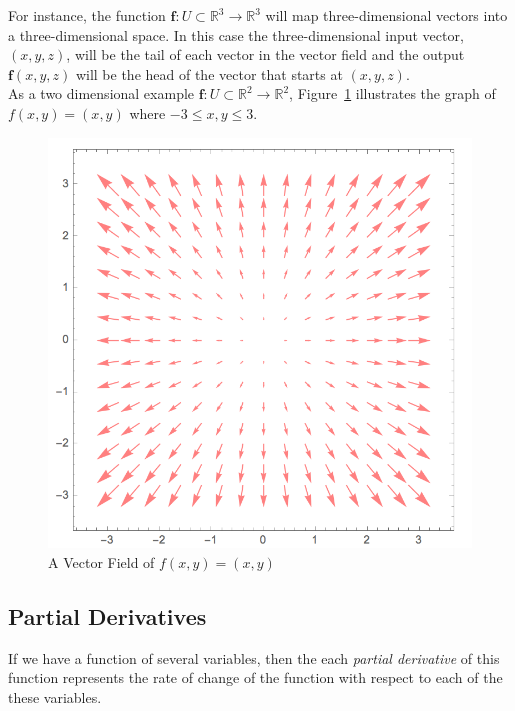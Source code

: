 \documentclass[12pt]{article}
\begin{document}
For instance, the function $\mathbf{f}:U\subset\mathbb{R}^3\rightarrow\mathbb{R}^3$ will map three-dimensional vectors into a three-dimensional space. In this case the three-dimensional input vector, $(x,y,z)$, will be the tail of each vector in the vector field and the output $\mathbf{f}(x,y,z)$ will be the head of the vector that starts at $(x,y,z)$. \\

As a two dimensional example $\mathbf{f}:U\subset\mathbb{R}^2\rightarrow\mathbb{R}^2$, Figure~\ref{fig:vectorfield} illustrates the graph of $f(x,y) = (x,y)$ where $-3\leq x,y\leq3$.

\begin{figure}[H]
\centering
\caption{A Vector Field of $f(x,y) = (x,y)$}
\label{fig:vectorfield}
\indent\includegraphics[scale=0.4]{vectorfield.png}
\end{figure}

\subsection{Partial Derivatives}

 If we have a function of several variables, then the each \emph{partial derivative} of this function represents the rate of change of the function with respect to each of the these variables. \\
\end{document}
